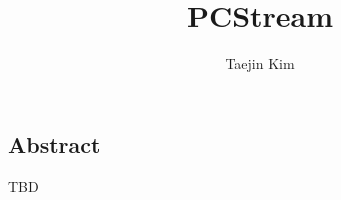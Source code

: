 \documentclass[letterpaper, twocolumn, 10pt]{article}
\begin{document}
\title{
PCStream
}


\author{
Taejin Kim
}

\maketitle

\thispagestyle{empty}

\subsection*{Abstract}
TBD







\end{document}
